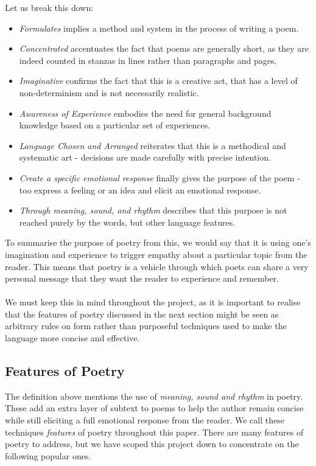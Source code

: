 Let us break this down:
\begin{itemize}
\item{\textit{Formulates} implies a method and system in the process of writing a poem.}
\item{\textit{Concentrated} accentuates the fact that poems are generally short, as they are indeed counted in stanzas in lines rather than paragraphs and pages.}
\item{\textit{Imaginative} confirms the fact that this is a creative act, that has a level of non-determinism and is not necessarily realistic.}
\item{\textit{Awareness of Experience} embodies the need for general background knowledge based on a particular set of experiences.}
\item{\textit{Language Chosen and Arranged} reiterates that this is a methodical and systematic art - decisions are made carefully with precise intention.}
\item{\textit{Create a specific emotional response} finally gives the purpose of the poem - too express a feeling or an idea and elicit an emotional response.}
\item{\textit{Through meaning, sound, and rhythm} describes that this purpose is not reached purely by the words, but other language features.}
\end{itemize}

To summarise the purpose of poetry from this, we would say that it is using one's imagination and experience to trigger empathy about a particular topic from the reader. This means that poetry is a vehicle through which poets can share a very personal message that they want the reader to experience and remember. 
\\\\
We must keep this in mind throughout the project, as it is important to realise that the features of poetry discussed in the next section might be seen as arbitrary rules on form rather than purposeful techniques used to make the language more concise and effective.

\subsection{Features of Poetry}

The definition above mentions the use of \textit{meaning, sound and rhythm} in poetry. These add an extra layer of subtext to poems to help the author remain concise while still eliciting a full emotional response from the reader. We call these techniques \textit{features} of poetry throughout this paper. There are many features of poetry to address, but we have scoped this project down to concentrate on the following popular ones.


